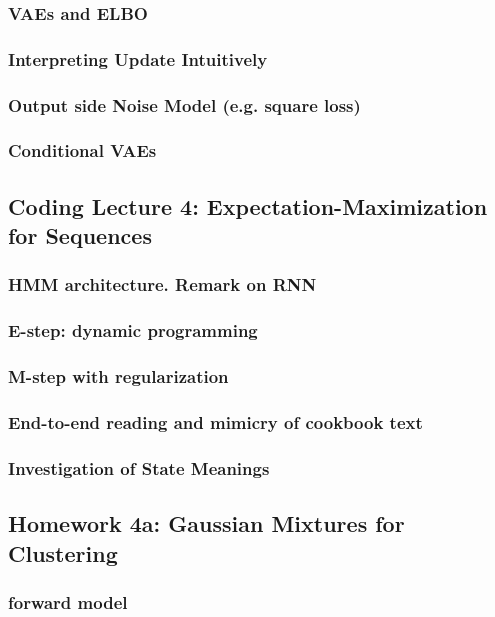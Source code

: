 \documentclass[12pt]{article}
\begin{document}
      \subsubsection*{VAEs and ELBO}
      \subsubsection*{Interpreting Update Intuitively}
      \subsubsection*{Output side Noise Model (e.g. square loss)}
      \subsubsection*{Conditional VAEs}
    \newpage

    \subsection*{Coding Lecture 4: Expectation-Maximization for Sequences}
      \subsubsection*{HMM architecture.  Remark on RNN}
      \subsubsection*{E-step: dynamic programming}
      \subsubsection*{M-step with regularization}
      \subsubsection*{End-to-end reading and mimicry of cookbook text}
      \subsubsection*{Investigation of State Meanings}
    \newpage

    \subsection*{Homework 4a: Gaussian Mixtures for Clustering} %
      \subsubsection*{forward model}
\end{document}
